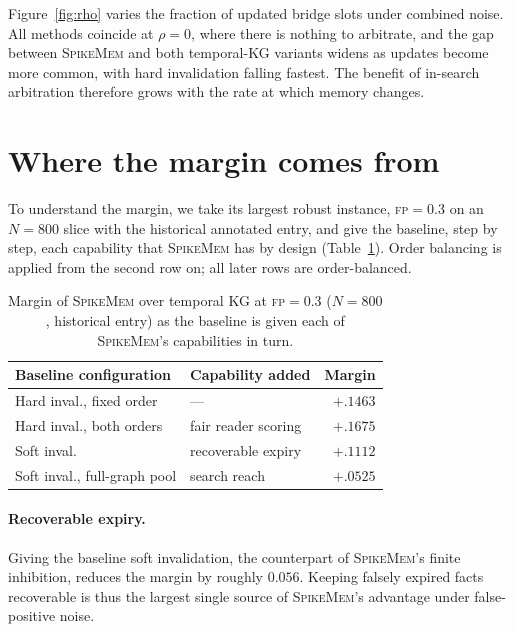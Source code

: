 \documentclass[11pt]{article}
\newcommand{\sm}{\textsc{SpikeMem}}
\begin{document}
Figure~\ref{fig:rho} varies the fraction of updated bridge slots under combined noise. All methods
coincide at $\rho=0$, where there is nothing to arbitrate, and the gap between \sm{} and both
temporal-KG variants widens as updates become more common, with hard invalidation falling fastest.
The benefit of in-search arbitration therefore grows with the rate at which memory changes.

\section{Where the margin comes from}
\label{sec:analysis}

To understand the margin, we take its largest robust instance, \textsc{fp}$=0.3$ on an $N=800$ slice
with the historical annotated entry, and give the baseline, step by step, each capability that \sm{}
has by design (Table~\ref{tab:decomp}). Order balancing is applied from the second row on; all later
rows are order-balanced.

\begin{table}[t]
\centering
\caption{Margin of \sm{} over temporal KG at \textsc{fp}$=0.3$ ($N=800$, historical entry) as the
baseline is given each of \sm{}'s capabilities in turn.}
\label{tab:decomp}
\small
\setlength{\tabcolsep}{3pt}
\begin{tabular}{@{}p{3.3cm}p{2.7cm}r@{}}
\toprule
Baseline configuration & Capability added & Margin \\
\midrule
Hard inval., fixed order    & ---                        & $+.1463$ \\
Hard inval., both orders    & fair reader scoring        & $+.1675$ \\
Soft inval.                 & recoverable expiry         & $+.1112$ \\
Soft inval., full-graph pool& search reach               & $+.0525$ \\
\bottomrule
\end{tabular}
\end{table}

\paragraph{Recoverable expiry.}
Giving the baseline soft invalidation, the counterpart of \sm{}'s finite inhibition, reduces the
margin by roughly $0.056$. Keeping falsely expired facts recoverable is thus the largest single
source of \sm{}'s advantage under false-positive noise.
\end{document}
